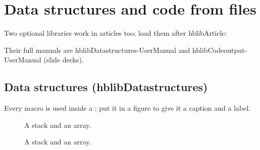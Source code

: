 \documentclass[11pt]{amsart}         %
\begin{document}
\section{Data structures and code from files}\label{sec:optional}

Two optional libraries work in articles too; load them after hblibArticle:

\begin{texcode}
\usepackage{../../cis000_latex/lib/hblibArticle}
\usepackage{../../cis000_latex/lib/hblibDatastructures}   %
\usepackage{../../cis000_latex/lib/hblibCodeoutput}       %
\end{texcode}

Their full manuals are hblibDatastructures-UserManual and hblibCodeoutput-UserManual (slide decks).

\subsection{Data structures (hblibDatastructures)}\label{sec:ds}
Every macro is used inside a ; put it in a figure to give it a caption and a label.

\begin{texcode}
\begin{figure}[h]
  \centering
  \caption{A stack and an array.}\label{fig:ds}
\end{figure}
\end{texcode}

\begin{figure}[h]
	\centering
	\caption{A stack and an array.}\label{fig:ds}
\end{figure}
\end{document}

